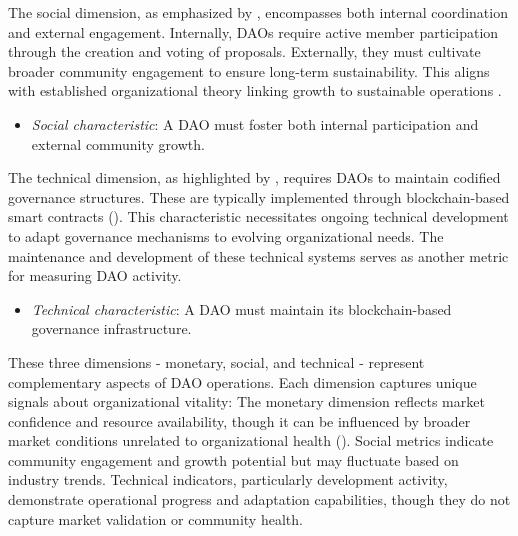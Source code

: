 \noindent The social dimension, as emphasized by \textcite{hassan2021decentralized}, encompasses both internal coordination and external engagement. 
Internally, DAOs require active member participation through the creation and voting of proposals. 
Externally, they must cultivate broader community engagement to ensure long-term sustainability. 
This aligns with established organizational theory linking growth to sustainable operations \textcite{butler2007organizational}.
\begin{itemize}
    \item \textit{Social characteristic}: A DAO must foster both internal participation and external community growth.
\end{itemize}

\noindent The technical dimension, as highlighted by \textcite{dupont2017experiments}, requires DAOs to maintain codified governance structures. 
These are typically implemented through blockchain-based smart contracts (\cite{bellavitis2023rise}). 
This characteristic necessitates ongoing technical development to adapt governance mechanisms to evolving organizational needs.
The maintenance and development of these technical systems serves as another metric for measuring DAO activity.
\begin{itemize}
    \item \textit{Technical characteristic}: A DAO must maintain its blockchain-based governance infrastructure.
\end{itemize}

These three dimensions - monetary, social, and technical - represent complementary aspects of DAO operations. Each dimension captures unique signals about organizational vitality:
The monetary dimension reflects market confidence and resource availability, though it can be influenced by broader market conditions unrelated to organizational health (\cite{richard2009measuring}). Social metrics indicate community engagement and growth potential but may fluctuate based on industry trends. Technical indicators, particularly development activity, demonstrate operational progress and adaptation capabilities, though they do not capture market validation or community health.


